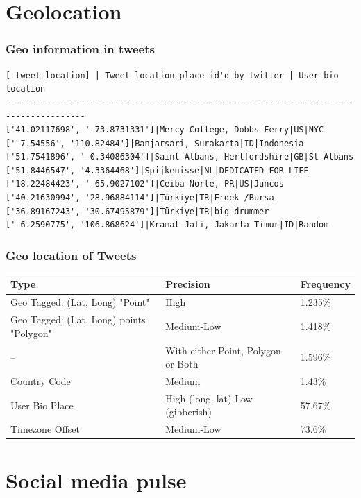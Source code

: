 \documentclass{beamer}
\begin{document}
\section{Geolocation}


\begin{frame}[fragile]
\frametitle{Geo information in tweets}
\begin{verbatim}
[ tweet location] | Tweet location place id'd by twitter | User bio location
--------------------------------------------------------------------------------------
['41.02117698', '-73.8731331']|Mercy College, Dobbs Ferry|US|NYC
['-7.54556', '110.82484']|Banjarsari, Surakarta|ID|Indonesia
['51.7541896', '-0.34086304']|Saint Albans, Hertfordshire|GB|St Albans
['51.8446547', '4.3364468']|Spijkenisse|NL|DEDICATED FOR LIFE
['18.22484423', '-65.9027102']|Ceiba Norte, PR|US|Juncos
['40.21630994', '28.96884114']|Türkiye|TR|Erdek /Bursa
['36.89167243', '30.67495879']|Türkiye|TR|big drummer
['-6.2590775', '106.868624']|Kramat Jati, Jakarta Timur|ID|Random
\end{verbatim}
\end{frame}

\begin{frame}\frametitle{Geo location of Tweets}
\begin{table}
\begin{tabular}{ m{3.5cm} | m{3cm} | m{2cm}}
\hline
Type & Precision & Frequency \\ \hline
Geo Tagged: (Lat, Long) "Point"	& High & 1.235\% \\ \hline
 Geo Tagged: (Lat, Long) points "Polygon" & Medium-Low	& 1.418\% \\ \hline
 -- & With either Point, Polygon or Both & 1.596\% \\\hline
 Country Code &	Medium & 1.43\% \\ \hline
 User Bio Place & High (long, lat)-Low (gibberish) &57.67\% \\ \hline
 Timezone Offset & Medium-Low & 73.6\% \\
 \hline
\end{tabular}
\end{table}
\end{frame}


\section{Social media pulse}

{
\begin{frame}[fragile]
\Huge{\color{black}\secname{}}
\end{frame}
}
\end{document}
